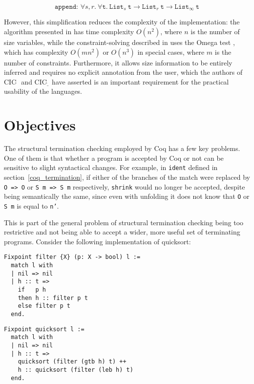 \documentclass{article}
\newcommand{\CIChat}{CIC$\widehat{~}$\ }
\newcommand{\CIChatbar}{CIC$\widehat{\underline{~}}$\ }
\begin{document}
$$\texttt{append: } \forall s, r.\ \forall \texttt{t}.\ \texttt{List}_s\ \texttt{t} \rightarrow \texttt{List}_{r}\ \texttt{t} \rightarrow \texttt{List}_{\infty}\ \texttt{t}$$

However, this simplification reduces the complexity of the implementation: the algorithm presented in \cite{inference} has time complexity $O(n^2)$, where $n$ is the number of size variables, while the constraint-solving described in \cite{hughes} uses the Omega test \cite{omega}, which has complexity $O(mn^2)$ or $O(n^3)$ in special cases, where $m$ is the number of constraints. Furthermore, it allows size information to be entirely inferred and requires no explicit annotation from the user, which the authors of \CIChat and \CIChatbar have asserted is an important requirement for the practical usability of the languages.

\section{Objectives}
The structural termination checking employed by Coq has a few key problems. One of them is that whether a program is accepted by Coq or not can be sensitive to slight syntactical changes. For example, in \texttt{ident} defined in section~\ref{coq_termination}, if either of the branches of the match were replaced by \texttt{O => O} or \texttt{S m => S m} respectively, \texttt{shrink} would no longer be accepted, despite being semantically the same, since even with unfolding it does not know that \texttt{O} or \texttt{S m} is equal to \texttt{n'}.

This is part of the general problem of structural termination checking being too restrictive and not being able to accept a wider, more useful set of terminating programs. Consider the following implementation of quicksort:

\begin{multicols}{2}
\begin{verbatim}
Fixpoint filter {X} (p: X -> bool) l :=
  match l with
  | nil => nil
  | h :: t =>
    if   p h
    then h :: filter p t
    else filter p t
  end.
\end{verbatim}

\begin{verbatim}
Fixpoint quicksort l :=
  match l with
  | nil => nil
  | h :: t =>
    quicksort (filter (gtb h) t) ++ 
    h :: quicksort (filter (leb h) t)
  end.
\end{verbatim}
\end{multicols}
\end{document}
